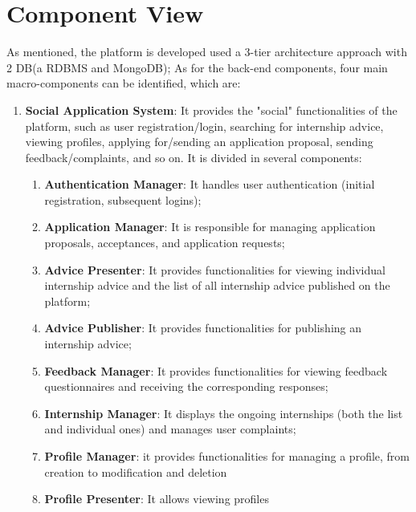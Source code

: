 		\section{Component View}
			As mentioned, the platform is developed used a 3-tier architecture approach with 2 DB(a RDBMS and MongoDB); As for the back-end components, four main macro-components can be identified, which are:
			\begin{enumerate}
				\item \textbf{Social Application System}: It provides the "social" functionalities of the platform, such as user registration/login, searching for internship advice, viewing profiles, applying for/sending an application proposal, sending feedback/complaints, and so on. It is divided in several components:
				\begin{enumerate}
					\item \textbf{Authentication Manager}: It handles user authentication (initial registration, subsequent logins);
					\item \textbf{Application Manager}: It is responsible for managing application proposals, acceptances, and application requests;
					\item \textbf{Advice Presenter}: It provides functionalities for viewing individual internship advice and the list of all internship advice published on the platform;
					\item \textbf{Advice Publisher}: It provides functionalities for publishing an internship advice;
					\item \textbf{Feedback Manager}: It provides functionalities for viewing feedback questionnaires and receiving the corresponding responses;
					\item \textbf{Internship Manager}: It displays the ongoing internships (both the list and individual ones) and manages user complaints;
					\item \textbf{Profile Manager}: it provides functionalities for managing a profile, from creation to modification and deletion
					\item \textbf{Profile Presenter}: It allows viewing profiles
					\end{enumerate}
					

\end{enumerate}
